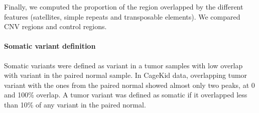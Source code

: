 Finally, we computed the proportion of the region overlapped by the different features (satellites, simple repeats and transposable elements).
We compared CNV regions and control regions.

\paragraph{Somatic variant definition}
Somatic variants were defined as variant in a tumor samples with low overlap with variant in the paired normal sample.
In CageKid data, overlapping tumor variant with the ones from the paired normal showed almost only two peaks, at 0 and 100\% overlap.
A tumor variant was defined as somatic if it overlapped less than 10\% of any variant in the paired normal.



